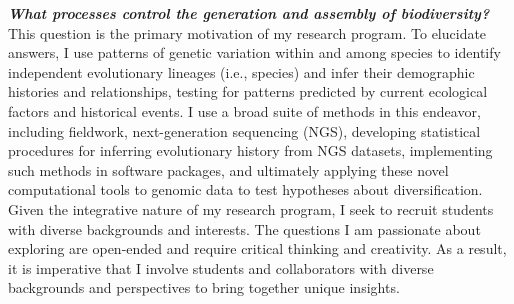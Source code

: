 \textbf{\textit{What processes control the generation and assembly of
        biodiversity?}}
This question is the primary motivation of my research program.
To elucidate answers, I use patterns of genetic variation within and among
species to identify independent evolutionary lineages (i.e., species) and infer
their demographic histories and relationships, testing for patterns predicted
by current ecological factors and historical events.
I use a broad suite of methods in this endeavor, including
fieldwork,
next-generation sequencing (NGS),
developing statistical procedures for inferring evolutionary
history from NGS datasets,
implementing such methods in software packages,
and ultimately applying these novel computational tools to genomic data to test
hypotheses about diversification.
Given the integrative nature of my research program, I seek to recruit students
with diverse backgrounds and interests.
The questions I am passionate about exploring are open-ended and require
critical thinking and creativity.
As a result, it is imperative that I involve students and collaborators with
diverse backgrounds and perspectives to bring together unique insights.

